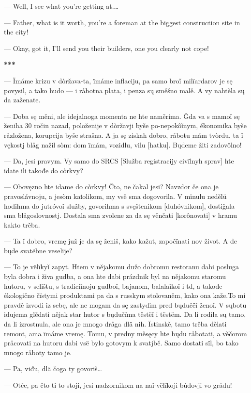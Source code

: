 — Well, I see what you’re getting at.…

— Father, what is it worth, you’re a foreman at the biggest construction site in the city!

— Okay, got it, I’ll send you their builders, one you clearly not cope!

\begin{center}
	\textbf{***}
\end{center}

— Ïmáme krizu v dòržava-ta, ïmáme inflaciju, pa samo broǐ milïardarov je sę povysil, a tako hudo — i råbotna plata, i penza sų směšno malě. A vy nahtěla sų da zaženate.

— Doba sę měni, ale idejalnoga momenta ne hte naměrima. Ĝda va s mamoǐ sę ženiha 30 ročin nazad, položenije v dòržavji byše po-nepokôǐnym, ékonomika byše råzložena, korupcija byše strašna. A ja sę ziskah dobro, råbotu mám tvòrdu, ta ǐ vękostj blåg nažil sòm: dom ïmám, vozidlu, vilu [hatku]. Bųdeme žiti zadovôlno!

— Da, jesi pravym. Vy samo do SRCS [Služba registracijy civïlnyh sprav] hte idate ili takođe do còrkvy?

— Obovęzno hte idame do còrkvy! Čto, ne čakal jesi? Navzdor če ona je pravoslávnoju, a jesòm kaŧolikom, my vsë sma dogovorila. V mïnulu nedělü hodihma do jutróvoǐ služby, govorihma s svęštenikom [duhóvnikom], dostiĝala sma blågoslovnostj. Dostala sma zvolene za da sę věnčati [korônovati] v hramu kakto trěba.

— Ta ǐ dobro, vremę juž je da sę ženiš, kako kažut, započïnati nov život. A de bųde svatëbne veselije?

— To je vëlïkyǐ zapyt. Htem v nějakomu dužo dobromu restoranu dabi posluga byla dobra i živa gudba, a ona hte dabi prázdnik byl na nějakomu staromu hutoru, v selištu, s tradiciǐnoju gudboǐ, bajanom, balalaǐkoǐ i td, a takođe ékologično čïstymi produktami pa da s russkym stolovanëm, kako ona kaže.To mi pravdě izvodi iz sebę, ale ne mogam da sę zastydim pred bųdučëǐ ženoǐ. V sųbotu idujema glědati nějak star hutor s bųdučïma tëstëǐ i tëstëm. Da li rodila sų tamo, da li izrostnula, ale ona je mnogo dråga dlä nih. Ïstinskě, tamo trěba dělati remont, ama ïmáme vremę. Tomu, v predny měsęcy hte bųdu råbotati, a věčorom pråcovati na hutoru dabi vsë bylo gotovym k svatjbě. Samo dostati sïl, bo tako mnogo råboty tamo je.

— Pa, viđu, dlä čoga ty govoriš…

— Otče, pa čto ti to stoji, jesi nadzornikom na naǐ-vëlïkoji búdovji vo grådu!

